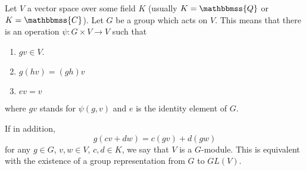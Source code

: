 \documentclass[12pt]{article}
\newcommand{\C}{\mathbbmss{C}}
\newcommand{\Q}{\mathbbmss{Q}}
\begin{document}
Let $V$ a vector space over some field $K$ (usually $K=\Q$ or $K=\C$).  Let $G$ 
be a group which acts on $V$.  This means that there is an operation 
$\psi \colon G\times V \to V$ such that
\begin{enumerate}
\item $gv \in V$.
\item $g(hv) = (gh)v$
\item $ev = v$
\end{enumerate}
where $gv$ stands for $\psi(g,v)$ and $e$ is the identity element of $G$.

If in addition, 
\[ g(cv + dw) = c(gv)+d(gw)\]
for any $g\in G$, $v,w \in V$, $c,d\in K$, we say that $V$ is a $G$-module. 
This is equivalent with the existence of a group representation from $G$ to $GL(V)$.
\end{document}
